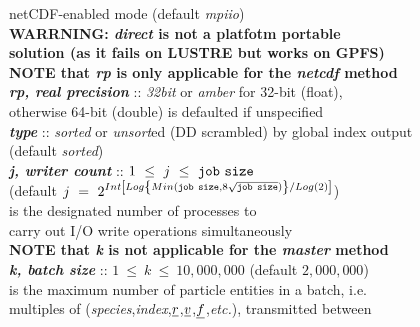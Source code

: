 \begin{tabbing}
\>                                              \> \phantom{x} netCDF-enabled mode (default {\em mpiio}) \\
\>                                              \> \phantom{x} {\bf WARRNING: {\em direct} is not a platfotm portable} \\
\>                                              \> \phantom{x} {\bf solution (as it fails on LUSTRE but works on GPFS)} \\
\>                                              \> {\bf NOTE that {\em rp} is only applicable for the {\em netcdf} method} \\
\>                                              \> {\bf \em rp, real precision} :: {\em 32bit} or {\em amber} for 32-bit (float), \\
\>                                              \> \phantom{x} otherwise 64-bit (double) is defaulted if unspecified \\
\>                                              \> {\bf \em type} :: {\em sorted} or {\em unsort}ed (DD scrambled) by global index output \\
\>                                              \> \phantom{x} (default {\em sorted}) \\
\>                                              \> \phantom{xxx} {\bf \em j, writer count} :: $1~\le~j~\le~{\tt job~size}$ \\
\>                                              \> \phantom{xxxx} (default $j~=~2^{Int\left[Log\left\{Min({\tt job~size},8\sqrt{\tt job~size})\right\}/Log(2)\right]}$) \\
\>                                              \> \phantom{xxxx} is the designated number of processes to \\
\>                                              \> \phantom{xxxx} carry out I/O write operations simultaneously \\
\>                                              \> {\bf NOTE that {\em k} is not applicable for the {\em master} method} \\
\>                                              \> \phantom{xxx} {\bf \em k, batch size} :: $1~\le~k~\le~10,000,000$ (default $2,000,000$) \\
\>                                              \> \phantom{xxxx} is the maximum number of particle entities in a batch, i.e. \\
\>                                              \> \phantom{xxxx} multiples of ({\em species},{\em index},$\mbox{$\underline{r}$}$,$\mbox{$\underline{v}$}$,$\mbox{$\underline{f}$}$,{\em etc.}), transmitted between \\

\end{tabbing}
